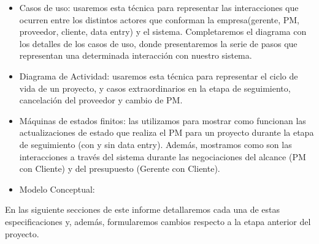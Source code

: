  \begin{itemize}
  \item Casos de uso: usaremos esta técnica para representar las interacciones que ocurren entre los distintos
  actores que conforman la empresa(gerente, PM, proveedor, cliente, data entry) y el sistema. Completaremos
  el diagrama con los detalles de los casos de uso, donde presentaremos la serie de pasos que representan una
  determinada interacción con nuestro sistema.
  \item Diagrama de Actividad: usaremos esta técnica para representar el ciclo de vida de un proyecto, y casos extraordinarios en la etapa de seguimiento, cancelación del proveedor y cambio de PM.
  \item Máquinas de estados finitos: las utilizamos para mostrar como funcionan las actualizaciones de estado que realiza el PM para un proyecto
  durante la etapa de seguimiento (con y sin data entry). Además, mostramos como son las interacciones a través del sistema durante las negociaciones
  del alcance (PM con Cliente) y del presupuesto (Gerente con Cliente).
  \item Modelo Conceptual:
 \end{itemize}

En las siguiente secciones de este informe detallaremos cada una de estas especificaciones y, además, formularemos cambios respecto a la etapa anterior del
proyecto. 
